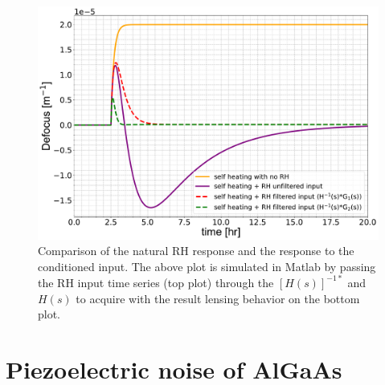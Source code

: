 \documentclass[12pt]{report}
\begin{document}
\begin{figure}[H]
\includegraphics[width=\textwidth]{IRHF/IRHF_compare_w_self}
\caption{Comparison of the natural RH response and the response to the conditioned input. The above plot is simulated in Matlab by passing the RH input time series (top plot) through the $[H(s)]^{-1*}$ and $H(s)$ to acquire with the result lensing behavior on the bottom plot.}
\label{fig:comparison}
\end{figure}
\newpage

\section{Piezoelectric noise of AlGaAs}

\end{document}
